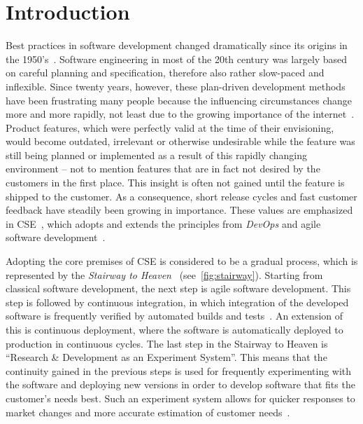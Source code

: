 %
\chapter{Introduction}
\label{ch:intro}





Best practices in software development changed dramatically since its origins in the 1950's~\cite{boehm2006view}.
Software engineering in most of the 20th century was largely based on careful planning and specification, therefore also rather slow-paced and inflexible.
Since twenty years, however, these plan-driven development methods have been frustrating many people because the influencing circumstances change more and more rapidly, not least due to the growing importance of the internet~\cite{Williams2003}.
Product features, which were perfectly valid at the time of their envisioning, would become outdated, irrelevant or otherwise undesirable while the feature was still being planned or implemented as a result of this rapidly changing environment -- not to mention features that are in fact not desired by the customers in the first place.
This insight is often not gained until the feature is shipped to the customer.
As a consequence, short release cycles and fast customer feedback have steadily been growing in importance.
These values are emphasized in \acf{CSE}~\cite{Bosch2014}, which adopts and extends the principles from \emph{DevOps} and agile software development~\cite{Fitzgerald2017,fowler2001agile}.

Adopting the core premises of \ac{CSE} is considered to be a gradual process, which is represented by the \emph{Stairway to Heaven}~\cite{Olsson2012} (see~\cref{fig:stairway}).
Starting from classical software development, the next step is agile software development.
This step is followed by continuous integration, in which integration of the developed software is frequently verified by automated builds and tests~\cite[Maintaining Model Integrity, pp.~341~ff.]{evans2004domain}.
An extension of this is continuous deployment, where the software is automatically deployed to production in continuous cycles.
The last step in the Stairway to Heaven is ``Research \& Development as an Experiment System''.
This means that the continuity gained in the previous steps is used for frequently experimenting with the software and deploying new versions in order to develop software that fits the customer's needs best.
Such an experiment system allows for quicker responses to market changes and more accurate estimation of customer needs~\cite{Olsson2012}.

